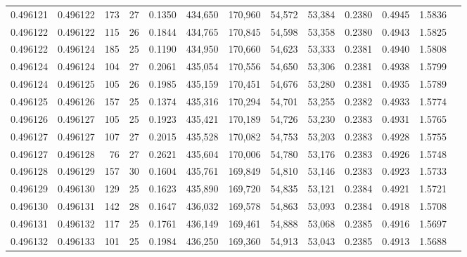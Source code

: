 \begin{tabular}{rrrrrrrrrrrrr}
0.496121 & 0.496122 & 173 &  27 &                                     0.1350 & 434,650 & 170,960 &  54,572 &  53,384 & 0.2380 & 0.4945 & 1.5836 \\
0.496122 & 0.496122 & 115 &  26 &                                     0.1844 & 434,765 & 170,845 &  54,598 &  53,358 & 0.2380 & 0.4943 & 1.5825 \\
0.496122 & 0.496124 & 185 &  25 &                                     0.1190 & 434,950 & 170,660 &  54,623 &  53,333 & 0.2381 & 0.4940 & 1.5808 \\
0.496124 & 0.496124 & 104 &  27 &                                     0.2061 & 435,054 & 170,556 &  54,650 &  53,306 & 0.2381 & 0.4938 & 1.5799 \\
0.496124 & 0.496125 & 105 &  26 &                                     0.1985 & 435,159 & 170,451 &  54,676 &  53,280 & 0.2381 & 0.4935 & 1.5789 \\
0.496125 & 0.496126 & 157 &  25 &                                     0.1374 & 435,316 & 170,294 &  54,701 &  53,255 & 0.2382 & 0.4933 & 1.5774 \\
0.496126 & 0.496127 & 105 &  25 &                                     0.1923 & 435,421 & 170,189 &  54,726 &  53,230 & 0.2383 & 0.4931 & 1.5765 \\
0.496127 & 0.496127 & 107 &  27 &                                     0.2015 & 435,528 & 170,082 &  54,753 &  53,203 & 0.2383 & 0.4928 & 1.5755 \\
0.496127 & 0.496128 &  76 &  27 &                                     0.2621 & 435,604 & 170,006 &  54,780 &  53,176 & 0.2383 & 0.4926 & 1.5748 \\
0.496128 & 0.496129 & 157 &  30 &                                     0.1604 & 435,761 & 169,849 &  54,810 &  53,146 & 0.2383 & 0.4923 & 1.5733 \\
0.496129 & 0.496130 & 129 &  25 &                                     0.1623 & 435,890 & 169,720 &  54,835 &  53,121 & 0.2384 & 0.4921 & 1.5721 \\
0.496130 & 0.496131 & 142 &  28 &                                     0.1647 & 436,032 & 169,578 &  54,863 &  53,093 & 0.2384 & 0.4918 & 1.5708 \\
0.496131 & 0.496132 & 117 &  25 &                                     0.1761 & 436,149 & 169,461 &  54,888 &  53,068 & 0.2385 & 0.4916 & 1.5697 \\
0.496132 & 0.496133 & 101 &  25 &                                     0.1984 & 436,250 & 169,360 &  54,913 &  53,043 & 0.2385 & 0.4913 & 1.5688 \\

\end{tabular}
